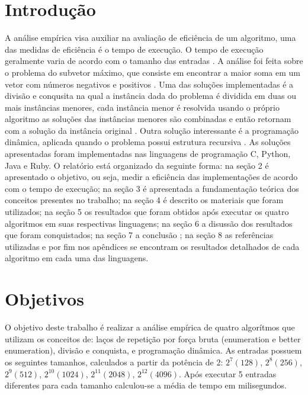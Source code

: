 \documentclass[
	12pt,				%
	oneside,   	        %
	a4paper,			%
	english,			%
	french,				%
	spanish,			%
	brazil,				%
	]{pacotes/abntex2}
\begin{document}
\tableofcontents*
\cleardoublepage

\textual

\makeatletter
\renewcommand{\chapter}{\@gobbletwo}
\makeatother

\section{Introdução}
\label{sec:introducao}


A análise empírica visa auxiliar na avaliação de eficiência de um algoritmo, uma das medidas de eficiência é o tempo de execução. O tempo de execução geralmente varia de acordo com o tamanho das entradas \cite{silva:12}.
A análise foi feita sobre o problema do subvetor máximo, que consiste em encontrar a maior soma em um vetor com números negativos e positivos \cite{goodrich:02}.
Uma das soluções implementadas  é a divisão e conqusita na qual a instância dada do problema é dividida em duas ou mais instâncias menores, cada instância menor é resolvida usando o próprio algoritmo  as soluções das instâncias menores são combinadas e então retornam com a solução da instância original \cite{feofiloff:03}.
Outra solução interessante é a programação dinâmica, aplicada quando o problema possui estrutura recursiva \cite{feofiloff:03}.
As soluções apresentadas foram implementadas nas linguagens de programação C, Python, Java e Ruby.
O relatório está organizado da seguinte forma: na seção 2 é apresentado o objetivo, ou seja, medir a eficiência das implementações de acordo com o tempo de execução; na seção 3 é apresentada a fundamentação teórica dos conceitos presentes no trabalho; na seção 4 é descrito os materiais que foram utilizados; na seção 5 os  resultados que foram obtidos após executar os quatro algoritmos em suas respectivas linguagens; na seção 6 a disussão dos resultados que foram conquistados; na seção 7 a conclusão ; na seção 8 as referências utilizadas e por fim nos apêndices se encontram os resultados detalhados de cada algoritmo em cada uma das linguagens.


\section{Objetivos}
\label{sec:objetivos}
O objetivo deste trabalho é realizar a análise empírica de quatro algorítmos que utilizam os conceitos de: laços de repetição por força bruta (enumeration e better enumeration), divisão e conquista, e programação dinâmica. As entradas possuem os seguintes tamanhos, calculados a partir da potência de 2: $2^7 (128)$, $2^8(256)$, $2^9(512)$, $2^{10}(1024)$, $2^{11}(2048)$, $2^{12}(4096)$. Após executar 5 entradas diferentes para cada tamanho calculou-se a média de tempo em milisegundos.
\end{document}
